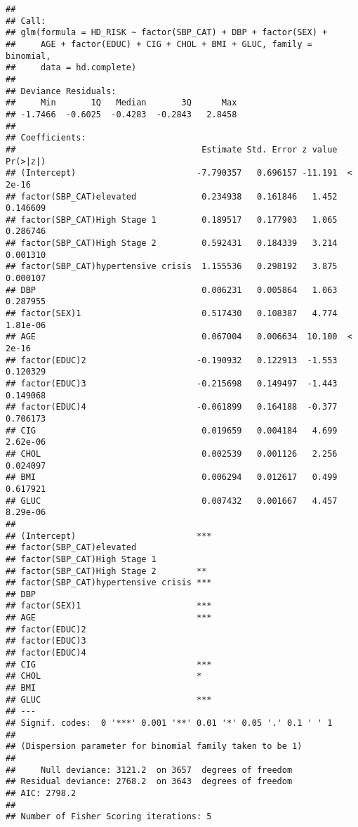 \documentclass[]{article}
\begin{document}
\begin{verbatim}
## 
## Call:
## glm(formula = HD_RISK ~ factor(SBP_CAT) + DBP + factor(SEX) + 
##     AGE + factor(EDUC) + CIG + CHOL + BMI + GLUC, family = binomial, 
##     data = hd.complete)
## 
## Deviance Residuals: 
##     Min       1Q   Median       3Q      Max  
## -1.7466  -0.6025  -0.4283  -0.2843   2.8458  
## 
## Coefficients:
##                                     Estimate Std. Error z value Pr(>|z|)
## (Intercept)                        -7.790357   0.696157 -11.191  < 2e-16
## factor(SBP_CAT)elevated             0.234938   0.161846   1.452 0.146609
## factor(SBP_CAT)High Stage 1         0.189517   0.177903   1.065 0.286746
## factor(SBP_CAT)High Stage 2         0.592431   0.184339   3.214 0.001310
## factor(SBP_CAT)hypertensive crisis  1.155536   0.298192   3.875 0.000107
## DBP                                 0.006231   0.005864   1.063 0.287955
## factor(SEX)1                        0.517430   0.108387   4.774 1.81e-06
## AGE                                 0.067004   0.006634  10.100  < 2e-16
## factor(EDUC)2                      -0.190932   0.122913  -1.553 0.120329
## factor(EDUC)3                      -0.215698   0.149497  -1.443 0.149068
## factor(EDUC)4                      -0.061899   0.164188  -0.377 0.706173
## CIG                                 0.019659   0.004184   4.699 2.62e-06
## CHOL                                0.002539   0.001126   2.256 0.024097
## BMI                                 0.006294   0.012617   0.499 0.617921
## GLUC                                0.007432   0.001667   4.457 8.29e-06
##                                       
## (Intercept)                        ***
## factor(SBP_CAT)elevated               
## factor(SBP_CAT)High Stage 1           
## factor(SBP_CAT)High Stage 2        ** 
## factor(SBP_CAT)hypertensive crisis ***
## DBP                                   
## factor(SEX)1                       ***
## AGE                                ***
## factor(EDUC)2                         
## factor(EDUC)3                         
## factor(EDUC)4                         
## CIG                                ***
## CHOL                               *  
## BMI                                   
## GLUC                               ***
## ---
## Signif. codes:  0 '***' 0.001 '**' 0.01 '*' 0.05 '.' 0.1 ' ' 1
## 
## (Dispersion parameter for binomial family taken to be 1)
## 
##     Null deviance: 3121.2  on 3657  degrees of freedom
## Residual deviance: 2768.2  on 3643  degrees of freedom
## AIC: 2798.2
## 
## Number of Fisher Scoring iterations: 5
\end{verbatim}
\end{document}
